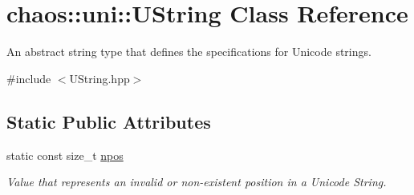\hypertarget{classchaos_1_1uni_1_1_u_string}{}\section{chaos\+:\+:uni\+:\+:U\+String Class Reference}
\label{classchaos_1_1uni_1_1_u_string}


An abstract string type that defines the specifications for Unicode strings.  




{\ttfamily \#include $<$U\+String.\+hpp$>$}

\subsection*{Static Public Attributes}
\begin{DoxyCompactItemize}
\item 
\hypertarget{classchaos_1_1uni_1_1_u_string_a5002d169446e9ab2baf8a028ec6ee9b0}{}static const size\+\_\+t \hyperlink{classchaos_1_1uni_1_1_u_string_a5002d169446e9ab2baf8a028ec6ee9b0}{npos}\label{classchaos_1_1uni_1_1_u_string_a5002d169446e9ab2baf8a028ec6ee9b0}

\begin{DoxyCompactList}\small\item\em Value that represents an invalid or non-\/existent position in a Unicode String. \end{DoxyCompactList}\end{DoxyCompactItemize}
